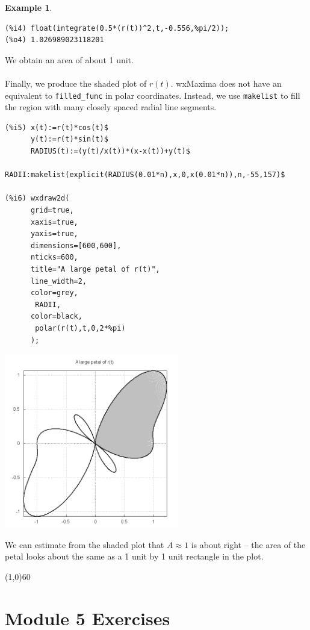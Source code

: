 \documentclass[10.5pt,twoside]{report}
\theoremstyle{definition}
\newtheorem{exmp}{Example}[section]
\begin{document}
\begin{exmp}
\begin{verbatim}
(%i4) float(integrate(0.5*(r(t))^2,t,-0.556,%pi/2));
(%o4) 1.026989023118201
\end{verbatim}

We obtain an area of about 1 unit.\\

${}$\\

Finally, we produce the shaded plot of $r(t)$. wxMaxima does not have an equivalent to \verb|filled_func| in polar coordinates.  Instead, we use \verb|makelist| to fill the region with many closely spaced radial line segments.

\begin{verbatim}
(%i5) x(t):=r(t)*cos(t)$
      y(t):=r(t)*sin(t)$
      RADIUS(t):=(y(t)/x(t))*(x-x(t))+y(t)$
      RADII:makelist(explicit(RADIUS(0.01*n),x,0,x(0.01*n)),n,-55,157)$
     
(%i6) wxdraw2d(
      grid=true,
      xaxis=true,
      yaxis=true,
      dimensions=[600,600],
      nticks=600,
      title="A large petal of r(t)",
      line_width=2,
      color=grey,
       RADII,
      color=black,
       polar(r(t),t,0,2*%pi)
      );
\end{verbatim}


\includegraphics[width=3in]{example_5_4_3_2}

We can estimate from the shaded plot that $A\approx 1$ is about right -- the area of the petal looks about the same as a 1 unit by 1 unit rectangle in the plot.

\end{exmp}

\line(1,0){60}
\linethickness{0.5mm}
\pagebreak

\pagebreak


\section{Module 5 Exercises}\label{Module 5 Exercises}
\end{document}
